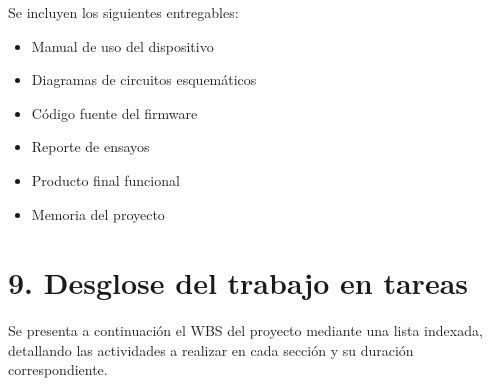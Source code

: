 \documentclass[
11pt, %
codirector, %
]{charter}
\begin{document}
Se incluyen los siguientes entregables:

\begin{itemize}
	\item Manual de uso del dispositivo
	\item Diagramas de circuitos esquemáticos
	\item Código fuente del firmware
	\item Reporte de ensayos
	\item Producto final funcional
	\item Memoria del proyecto
\end{itemize}

\section{9. Desglose del trabajo en tareas}
\label{sec:wbs}

Se presenta a continuación el WBS del proyecto mediante una lista indexada, detallando las actividades a realizar en cada sección y su duración correspondiente.
\end{document}
